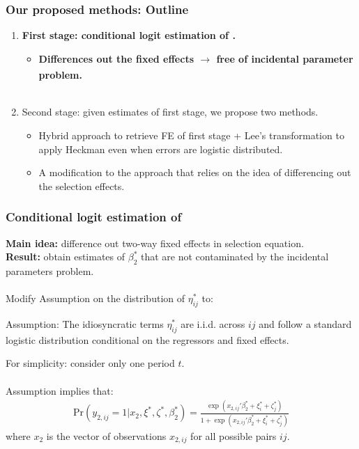 \begin{frame}
    \frametitle{Our proposed methods: Outline}
    \begin{enumerate}
        \item \textbf{First stage: conditional logit estimation of \cite{charbonneau2017multiple}.}
        \begin{itemize}
            \item \textbf{Differences out the fixed effects $\xrightarrow[]{}$ free of incidental parameter problem.}\\~\\ 
        \end{itemize}
        \item Second stage: given estimates of first stage, we propose two methods.
        \begin{itemize}
            \item Hybrid approach to retrieve FE of first stage + Lee's transformation to apply Heckman even when errors are logistic distributed.
            \item A modification to the \cite{kyriazidou1997estimation} approach that relies on the idea of differencing out the selection effects.
        \end{itemize}
    \end{enumerate}
\end{frame}
\begin{frame}
    \frametitle{{Conditional logit estimation of \cite{charbonneau2017multiple}}}
\textbf{Main idea:} difference out two-way fixed effects in selection equation. \\
\textbf{Result:} obtain estimates of $\beta_2^*$ that are not contaminated by the incidental parameters problem. 
\\~\\ \pause
Modify Assumption on the distribution of $\eta_{ij}^*$ to: 
\begin{block}{Assumption:}
    The idiosyncratic terms $\eta_{ij}^*$ are i.i.d. across $ij$ and follow a standard logistic distribution conditional on the regressors and fixed effects.
\end{block}
For simplicity: consider only one period $t$. \\~\\ \pause
Assumption implies that:
\begin{align*}
    \text{Pr}(y_{2,ij} = 1 \rvert x_{2}, \xi^*, \zeta^*, \beta_2^*) = \frac{\exp (x_{2,ij}'{\beta_2^*}  +\xi_{i}^*+\zeta_{j}^*)}{1 + \exp (x_{2,ij}'{\beta_2^*}  +\xi_{i}^*+\zeta_{j}^*)}
\end{align*}
\noindent where $x_{2}$ is the vector of observations $x_{2,ij}$ for all possible pairs $ij$.

\end{frame}

